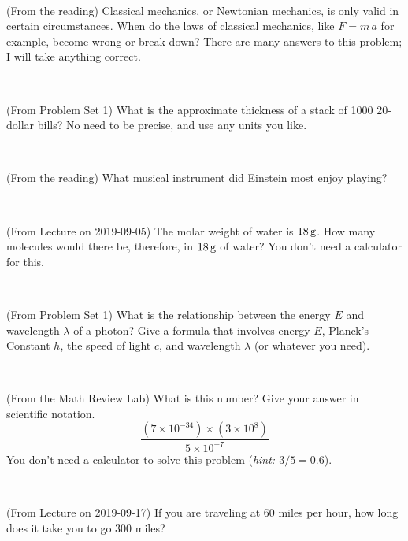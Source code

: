 \documentclass[12pt, letterpaper]{article}
\begin{document}
\vfill ~

\begin{problem} (From the reading)
Classical mechanics, or Newtonian mechanics, is only valid in certain
circumstances. When do the laws of classical mechanics, like $F =
m\,a$ for example, become wrong or break down? There are many answers
to this problem; I will take anything correct.
\end{problem}


\vfill ~

\begin{problem} (From Problem Set 1)
What is the approximate thickness of a stack of 1000 20-dollar bills?
No need to be precise, and use any units you like.
\end{problem}


\vfill ~

\begin{problem} (From the reading)
What musical instrument did Einstein most enjoy playing?
\end{problem}


\vfill ~


\clearpage


\begin{problem} (From Lecture on 2019-09-05)
The molar weight of water is $18\,\mathrm{g}$. How many molecules would there
be, therefore, in $18\,\mathrm{g}$ of water? You don't need a calculator for
this.
\end{problem}


\vfill ~

\begin{problem} (From Problem Set 1)
What is the relationship between the energy $E$ and wavelength
$\lambda$ of a photon? Give a formula that involves energy $E$,
Planck's Constant $h$, the speed of light $c$, and wavelength
$\lambda$ (or whatever you need).
\end{problem}

\vfill ~

\begin{problem} (From the Math Review Lab)
What is this number? Give your answer in scientific notation.
$$
\frac{(7\times10^{-34})\times(3\times10^8)}{5\times10^{-7}}
$$
You don't need a calculator to solve this problem (\textit{hint: $3/5=0.6$}).
\end{problem}


\vfill ~

\begin{problem} (From Lecture on 2019-09-17)
If you are traveling at 60 miles per hour, how long does
it take you to go 300 miles?
\end{problem}
\end{document}
